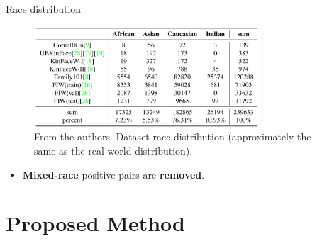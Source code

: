 \documentclass[aspectratio=169,xcolor=dvipsnames]{beamer}
\begin{document}
\begin{frame}{Race distribution}
    \begin{figure}
        \centering
        \includegraphics[width=0.75\textwidth]{imgs/2_Table1.png}
        \caption{From the authors. Dataset race distribution (approximately the same as the real-world distribution).}
        \label{fig:kfc-dataset-distribution}
    \end{figure}
    \begin{itemize}
        \item \textbf{Mixed-race} positive pairs are \textbf{removed}.
    \end{itemize}
\end{frame}

\section{Proposed Method}
\end{document}
